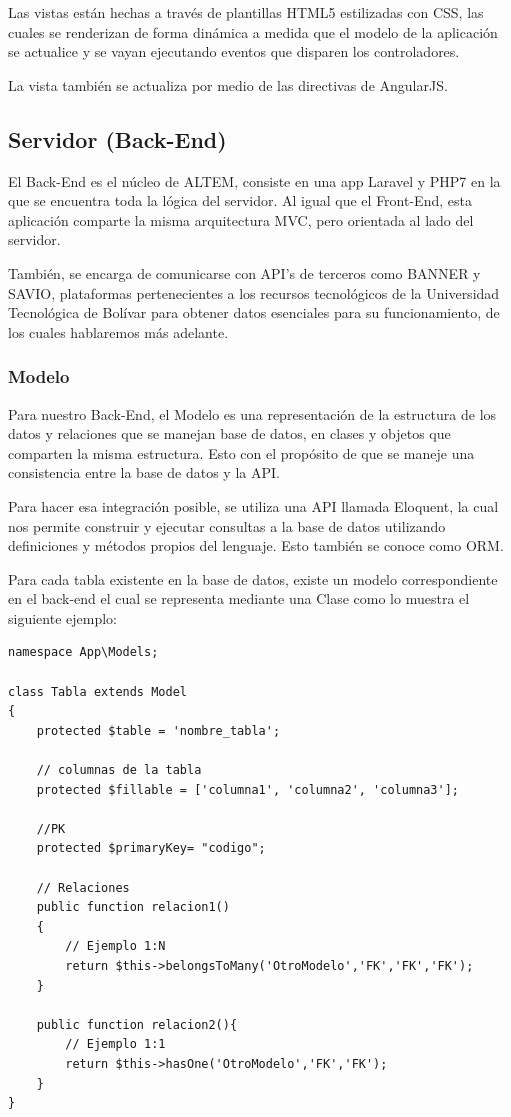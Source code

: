 Las vistas están hechas a través de plantillas HTML5 estilizadas con CSS, las cuales se renderizan de forma dinámica a medida que el modelo de la aplicación se actualice y se vayan ejecutando eventos que disparen los controladores.

La vista también se actualiza por medio de las directivas de AngularJS.

\subsection{Servidor (Back-End)}
El Back-End es el núcleo de ALTEM, consiste en una app Laravel y PHP7 en la que se encuentra toda la lógica del servidor.
Al igual que el Front-End, esta aplicación comparte la misma arquitectura MVC, pero orientada al lado del servidor.

También, se encarga de comunicarse con API's de terceros como BANNER y SAVIO, plataformas pertenecientes a los recursos tecnológicos de la Universidad Tecnológica de Bolívar para obtener datos esenciales para su funcionamiento, de los cuales hablaremos más adelante. 

\subsubsection{Modelo}
Para nuestro Back-End, el Modelo es una representación de la estructura de los datos y relaciones que se manejan  base de datos, en clases y objetos que comparten la misma estructura. Esto con el propósito de que se maneje una consistencia entre la base de datos y la API.

Para hacer esa integración posible, se utiliza una API llamada Eloquent, la cual nos permite construir y ejecutar consultas a la base de datos utilizando definiciones y métodos propios del lenguaje. Esto también se conoce como ORM.

Para cada tabla existente en la base de datos, existe un modelo correspondiente en el back-end el cual se representa mediante una Clase como lo muestra el siguiente ejemplo:

\begin{lstlisting}
namespace App\Models;

class Tabla extends Model
{
    protected $table = 'nombre_tabla';
    
    // columnas de la tabla
    protected $fillable = ['columna1', 'columna2', 'columna3'];

    //PK
    protected $primaryKey= "codigo";

    // Relaciones
    public function relacion1()
    {
        // Ejemplo 1:N
        return $this->belongsToMany('OtroModelo','FK','FK','FK');
    }

    public function relacion2(){
        // Ejemplo 1:1
        return $this->hasOne('OtroModelo','FK','FK');
    }
}
\end{lstlisting}


